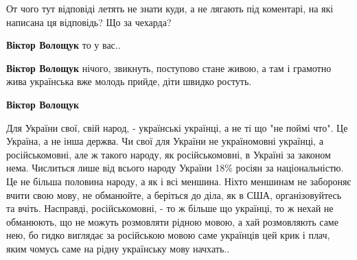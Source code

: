 \begin{itemize}
\begin{itemize}
\begin{itemize}
От чого тут відповіді летять не знати куди, а не лягають під коментарі, на які написана ця відповідь? Що за чехарда?

 
\textbf{Віктор Волощук} то у вас..

 
\textbf{Віктор Волощук} нічого, звикнуть, поступово стане живою, а там і грамотно жива українська вже молодь прийде, діти швидко ростуть.

 
\textbf{Віктор Волощук} 

Для України свої, свій народ, - українські українці, а не ті що "не поймі что".
Це Україна, а не інша держва. Чи свої для України не україномовні українці, а
російськомовні, але ж такого народу, як російськомовні, в Україні за законом
нема. Числиться лише від всього народу України 18\% росіян за національністю. Це
не більша половина народу, а як і всі меншина. Ніхто меншинам не забороняє
вчити свою мову, не обманюйте, а беріться до діла, як в США, організовуйтесь та
вчіть. Насправді, російськомовні, - то ж більше що українці, то ж нехай не
обманюють, що не можуть розмовляти рідною мовою, а хай розмовляють саме нею, бо
гидко виглядає за російською мовою саме українців цей крик і плач, яким чомусь
саме на рідну українську мову начхать..

\end{itemize}

\end{itemize}

 


\end{itemize}
